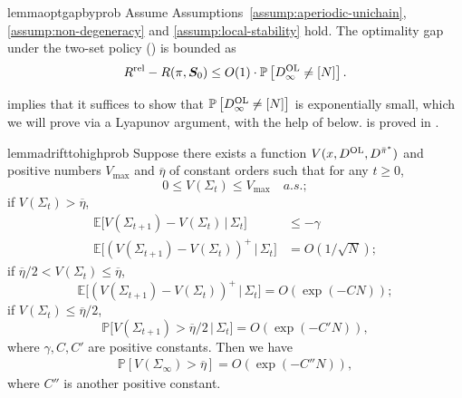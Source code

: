 \documentclass[11pt,letterpaper]{article}
\theoremstyle{plain}
\theoremstyle{definition}
\theoremstyle{remark}
\newcommand{\Ebig}[1]{\mathbb{E}\big[#1\big]}
\newcommand{\givenbig}{\,\big|\,}
\newcommand{\Probbig}[1]{\mathbb{P}\big[#1\big]}
\newcommand{\Prob}[1]{\mathbb{P}\left[#1\right]}
\newcommand{\ve}[1]{\bm{#1}}
\newcommand{\veS}{\ve{S}}
\newcommand{\rel}{\textup{rel}} %
\newcommand{\ravg}{R}
\newcommand{\rsysn}{\ravg(\pi, \veS_0)}
\newcommand{\rrel}{\ravg^\rel}
\newcommand{\pibar}{{\sysbar{\pi}}}
\newcommand{\pibs}{{\pibar^*}}
\newcommand{\sysbar}[1]{\bar{#1}}
\newcommand{\threshbar}{\overline{\eta}}
\newcommand{\Da}{D^{\pibs}}
\newcommand{\Db}{D^{\textup{OL}}}
\newcommand{\Fullstate}{\Sigma}
\begin{document}
\begin{restatable}{lemma}{optgapbyprob}\label{lem:two-set:opt-gap-bound-by-prob}
    Assume Assumptions~\ref{assump:aperiodic-unichain}, \ref{assump:non-degeneracy} and \ref{assump:local-stability} hold. 
    The optimality gap under the two-set policy () is bounded as 
    \begin{equation}
        \rrel - \rsysn \leq O(1) \cdot \Prob{\Db_\infty \neq [N]}.
    \end{equation}
\end{restatable}

 implies that it suffices to show that $\Prob{\Db_\infty \neq [N]}$ is exponentially small, which we will prove via a Lyapunov argument, with the help of  below.  is proved in . 

\begin{restatable}{lemma}{drifttohighprob}\label{lem:drift-to-high-prob-bound}
    Suppose there exists a function $V(x, \Db, \Da)$ and positive numbers $V_{\max}$ and $\threshbar$ of constant orders such that for any $t\geq 0$,
    \begin{equation}
        \label{eq:two-set:drift-lem:bounded}
        0 \leq V(\Fullstate_t) \leq V_{\max} \quad a.s.;
    \end{equation}
    if $V(\Fullstate_{t}) > \threshbar$,
    \begin{align}
        \label{eq:two-set:drift-lem:drift-1}
        \Ebig{V(\Fullstate_{t+1}) - V(\Fullstate_t) \givenbig \Fullstate_t} &\leq -\gamma \\
        \label{eq:two-set:drift-lem:jump-1}
         \Ebig{(V(\Fullstate_{t+1}) - V(\Fullstate_t))^+  \givenbig \Fullstate_t} &= O(1/\sqrt{N});
    \end{align}
    if $\threshbar/2 < V(\Fullstate_t) \leq \threshbar$,
    \begin{equation}
        \label{eq:two-set:drift-lem:jump-2}
        \Ebig{(V(\Fullstate_{t+1}) - V(\Fullstate_t))^+  \givenbig \Fullstate_t} = O(\exp(-C N)); 
    \end{equation}
    if $V(\Fullstate_{t}) \leq \threshbar/2$,
    \begin{equation}
        \label{eq:two-set:drift-lem:jump-3}
        \Probbig{V(\Fullstate_{t+1}) > \threshbar/2  \givenbig \Fullstate_t} = O(\exp(-C' N)), 
    \end{equation}
    where $\gamma, C, C'$ are positive constants. 
    Then we have 
    \begin{align}
        \label{eq:two-set:drift-lem:conclusion}
        \Prob{V(\Fullstate_{\infty}) > \threshbar} = O(\exp(-C'' N)),   
    \end{align}
    where $C''$ is another positive constant. 
\end{restatable}
\end{document}

